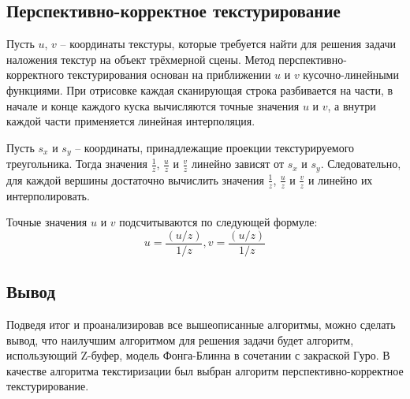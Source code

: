 \subsection{Перспективно-корректное текстурирование}

Пусть  $u$, $v$ -- координаты текстуры, которые требуется найти для решения задачи наложения текстур на объект трёхмерной сцены.
Метод перспективно-корректного текстурирования основан на приближении $u$ и $v$ кусочно-линейными функциями.
При отрисовке каждая сканирующая строка разбивается на части, в начале и конце каждого куска вычисляются точные значения
$u$ и $v$, а внутри каждой части применяется линейная интерполяция.

Пусть $s_x$ и $s_y$ -- координаты, принадлежащие проекции текстурируемого треугольника.
Тогда значения $ \frac{1}{z} $, $ \frac{u}{z} $ и $ \frac{v}{z} $ линейно зависят от $s_x$ и $s_y$.
Следовательно, для каждой вершины достаточно вычислить значения $ \frac{1}{z} $, $ \frac{u}{z} $ и $ \frac{v}{z} $ и линейно их интерполировать.

Точные значения $ u $ и $ v $ подсчитываются по следующей формуле: 
\begin{equation}
	u = \frac{(u/z)}{1/z},  v = \frac{(u/z)}{1/z} 
\end{equation}

\subsection*{Вывод}
Подведя итог и проанализировав все вышеописанные алгоритмы, можно сделать вывод, что наилучшим алгоритмом для решения задачи будет алгоритм, использующий Z-буфер, модель Фонга-Блинна в сочетании с закраской Гуро. В качестве алгоритма текстиризации был выбран алгоритм перспективно-корректное текстурирование.